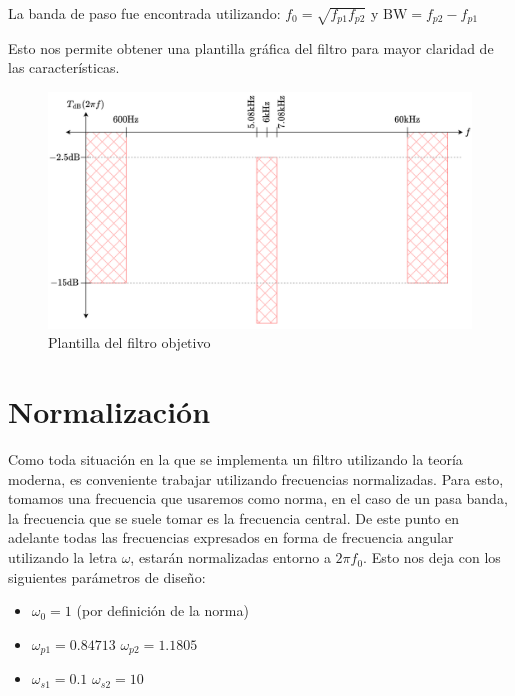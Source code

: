 \documentclass[11pt,a4paper]{report}
\begin{document}
La banda de paso fue encontrada utilizando: $f_0 = \sqrt{f_{p1} f_{p2}}$ \hspace{5pt} y \hspace{5pt} $\mathrm{BW} = f_{p2} - f_{p1}$

Esto nos permite obtener una plantilla gráfica del filtro para mayor claridad de las características.
\vspace{1cm}


\begin{figure}[h]
\includegraphics[scale=0.45]{figs/plantilla.png}
\caption{Plantilla del filtro objetivo}
\end{figure}


\section{Normalización}

Como toda situación en la que se implementa un filtro utilizando la teoría moderna, es conveniente trabajar utilizando frecuencias normalizadas. Para esto, tomamos una frecuencia que usaremos como norma, en el caso de un pasa banda, la frecuencia que se suele tomar es la frecuencia central.
De este punto en adelante todas las frecuencias expresados en forma de frecuencia angular utilizando la letra $\omega$, estarán normalizadas entorno a $2 \pi f_0$. Esto nos deja con los siguientes parámetros de diseño:

\begin{itemize}
    \item $\omega_0 = 1$ (por definición de la norma)
    \item $\omega_{p1} = 0.84713$ \hspace{5pt} $\omega_{p2} = 1.1805$
    \item $\omega_{s1} = 0.1$ \hspace{5pt} $\omega_{s2} = 10$

\end{itemize}
\end{document}
